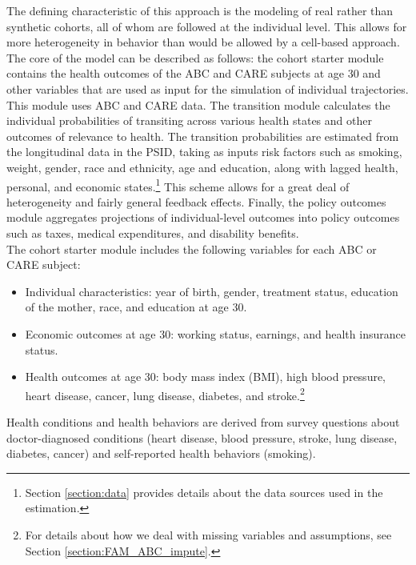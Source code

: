 \noindent The defining characteristic of this approach is the modeling of real rather than synthetic cohorts, all of whom
are followed at the individual level. This allows for more heterogeneity in behavior than would be allowed
by a cell-based approach. The core of the model can be described as follows: the cohort starter module contains the health outcomes of the ABC and CARE subjects at age 30 and other variables that are used as input for the simulation of individual trajectories. This module uses ABC and CARE data. The transition module calculates the individual probabilities of transiting across various health states and other outcomes of relevance to health. The transition probabilities are estimated from the longitudinal data in the PSID, taking as inputs risk factors such as smoking, weight, gender, race and ethnicity, age and education, along with lagged health, personal, and economic states.\footnote{Section \ref{section:data} provides details about the data sources used in the estimation.} This scheme allows for a great deal of heterogeneity and fairly general feedback effects. Finally, the policy outcomes module aggregates projections of individual-level outcomes into policy outcomes such as
taxes, medical expenditures, and disability benefits. \\


\noindent The cohort starter module includes the following variables for each ABC or CARE subject: \\
\begin{itemize}
\item Individual characteristics: year of birth, gender, treatment status, education of the mother, race, and education at age 30.
\item Economic outcomes at age 30: working status, earnings, and health insurance status.
\item Health outcomes at age 30: body mass index (BMI), high blood pressure, heart disease, cancer, lung disease, diabetes, and stroke.\footnote{For details about how we deal with missing variables and assumptions, see Section \ref{section:FAM_ABC_impute}. %
}
\end{itemize}
\noindent Health conditions and health behaviors are derived from survey questions about doctor-diagnosed conditions (heart disease, blood pressure, stroke, lung disease, diabetes, cancer) and self-reported health behaviors (smoking). \\

